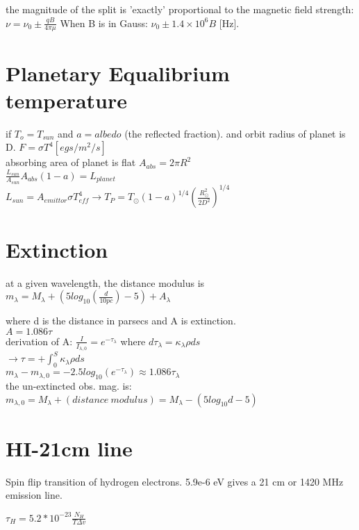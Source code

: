 \documentclass[12pt]{report}
\begin{document}
the magnitude of the split is 'exactly' proportional to the magnetic field strength: \(\boxed{\nu=\nu_0\pm \frac{qB}{4\pi\mu}}\)
When B is in Gauss: \({\nu_0\pm1.4\times10^6B }\) [Hz].  




\section{Planetary Equalibrium temperature}
if $T_o=T_{sun}$ and $a=albedo$ (the reflected fraction). and orbit radius of planet is D. $F=\sigma T^4 [egs/m^2/s]$\\
absorbing area of planet is flat $A_{abs}=2\pi R^2$\\ 
$\frac{L_{sun}}{A_{sun}}A_{abs}(1-a)=L_{planet}$\\
$L_{sun}=A_{emittor}\sigma T_{eff}^4 \rightarrow T_P=T_\odot(1-a)^{1/4}(\frac{R_\odot^2}{2D^2})^{1/4}$\\



\section{Extinction}
at a given wavelength, the distance modulus is 
\(m_\lambda=M_\lambda+(5log_{10}(\frac{d}{10pc})-5)+A_\lambda\)

where d is the distance in parsecs and A is extinction.\\
$A=1.086\tau$\\
derivation of A: $\frac{I}{I_{\lambda,0}}=e^{-\tau_\lambda}$ where $d\tau_\lambda=\kappa_\lambda\rho ds$\\
$\rightarrow \tau=+\int_0^S\kappa_\lambda\rho ds$\\
$m_\lambda-m_{\lambda, 0}=-2.5log_{10}(e^{-\tau_\lambda})\approx 1.086\tau_\lambda$\\
the un-extincted obs. mag. is: $m_{\lambda, 0}=M_\lambda+(distance \ modulus)=M_\lambda-(5log_{10}d-5)$



\section{HI-21cm line}
Spin flip transition of hydrogen electrons. 5.9e-6 eV gives a 21 cm or 1420 MHz emission line.
 
$\tau_H=5.2*10^{-23} \frac{N_H}{T\Delta v}$\\
\end{document}

